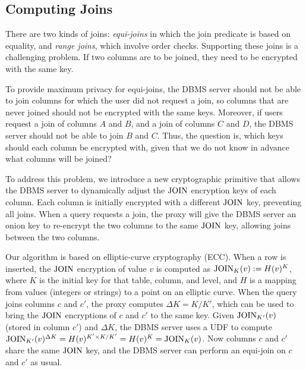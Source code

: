 \subsection{Computing Joins}
\label{ss:join}

There are two kinds of joins: {\em equi-joins} in which
the join predicate is based on equality, and {\em range joins}, which
involve order checks.
Supporting these joins is a challenging problem.  If two columns are
to be joined, they need to be encrypted with the same key.



To provide maximum privacy for equi-joins, the DBMS server should not
be able to join columns for which the user did not request a join, so
columns that are never joined should not be encrypted with the same
keys.  Moreover, if users request a join of columns $A$
and $B$, and a join of columns $C$ and $D$, the DBMS server should not
be able to join $B$ and $C$\@.  Thus, the question is, which keys
should each column be encrypted with, given that we do not know in
advance what columns will be joined?

To address this problem, we introduce a new cryptographic primitive
that allows the DBMS server to dynamically adjust the $\textrm{JOIN}$
encryption keys of each column.  Each column is initially encrypted
with a different $\textrm{JOIN}$ key, preventing all joins.  When a query
requests a join, the proxy will give the DBMS server an onion key to
re-encrypt the two columns to the same $\textrm{JOIN}$ key, allowing joins
between the two columns.

Our algorithm is based on elliptic-curve cryptography (ECC).  When a
row is inserted, the $\textrm{JOIN}$ encryption of value $v$ is computed as
$\textrm{JOIN}_K(v) := H(v)^K$, where $K$ is the initial key for that table,
column, and level, and $H$ is a mapping from values (integers or
strings) to a point on an elliptic curve.  When the query joins columns $c$ and
$c'$, the proxy computes $\Delta K=K/K'$, which can be used to bring
the $\textrm{JOIN}$ encryptions of $c$ and $c'$ to the same key.  Given
$\textrm{JOIN}_{K'}(v)$ (stored in column $c'$) and $\Delta K$, the DBMS
server uses a UDF to compute $\textrm{JOIN}_{K'}(v)^{\Delta K} =
H(v)^{K'\times K / K'} = H(v)^K = \textrm{JOIN}_K(v)$.  Now columns $c$ and
$c'$ share the same $\textrm{JOIN}$ key, and the DBMS server can perform an
equi-join on $c$ and $c'$ as usual.

